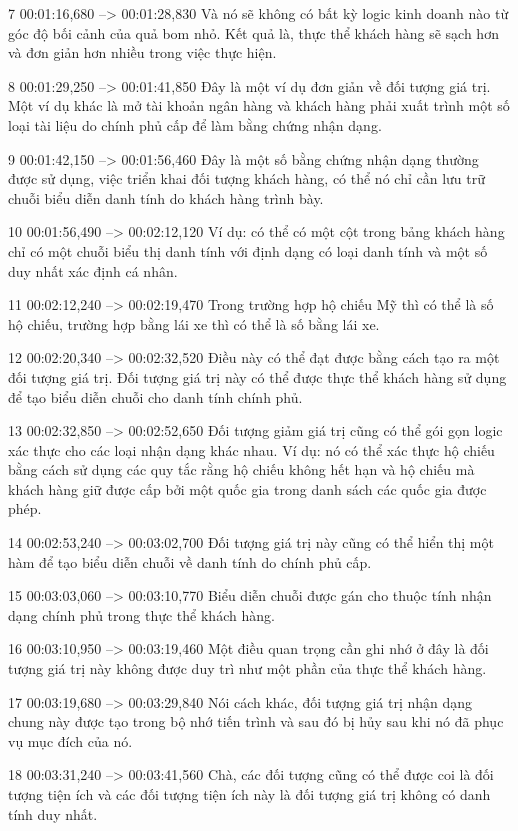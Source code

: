 7
00:01:16,680 --> 00:01:28,830
Và nó sẽ không có bất kỳ logic kinh doanh nào từ góc độ bối cảnh của quả bom nhỏ.  Kết quả là, thực thể khách hàng sẽ sạch hơn và đơn giản hơn nhiều trong việc thực hiện.

8
00:01:29,250 --> 00:01:41,850
Đây là một ví dụ đơn giản về đối tượng giá trị.  Một ví dụ khác là mở tài khoản ngân hàng và khách hàng phải xuất trình một số loại tài liệu do chính phủ cấp để làm bằng chứng nhận dạng.

9
00:01:42,150 --> 00:01:56,460
Đây là một số bằng chứng nhận dạng thường được sử dụng, việc triển khai đối tượng khách hàng, có thể nó chỉ cần lưu trữ chuỗi biểu diễn danh tính do khách hàng trình bày.

10
00:01:56,490 --> 00:02:12,120
Ví dụ: có thể có một cột trong bảng khách hàng chỉ có một chuỗi biểu thị danh tính với định dạng có loại danh tính và một số duy nhất xác định cá nhân.

11
00:02:12,240 --> 00:02:19,470
Trong trường hợp hộ chiếu Mỹ thì có thể là số hộ chiếu, trường hợp bằng lái xe thì có thể là số bằng lái xe.

12
00:02:20,340 --> 00:02:32,520
Điều này có thể đạt được bằng cách tạo ra một đối tượng giá trị.  Đối tượng giá trị này có thể được thực thể khách hàng sử dụng để tạo biểu diễn chuỗi cho danh tính chính phủ.

13
00:02:32,850 --> 00:02:52,650
Đối tượng giảm giá trị cũng có thể gói gọn logic xác thực cho các loại nhận dạng khác nhau.  Ví dụ: nó có thể xác thực hộ chiếu bằng cách sử dụng các quy tắc rằng hộ chiếu không hết hạn và hộ chiếu mà khách hàng giữ được cấp bởi một quốc gia trong danh sách các quốc gia được phép.

14
00:02:53,240 --> 00:03:02,700
Đối tượng giá trị này cũng có thể hiển thị một hàm để tạo biểu diễn chuỗi về danh tính do chính phủ cấp.

15
00:03:03,060 --> 00:03:10,770
Biểu diễn chuỗi được gán cho thuộc tính nhận dạng chính phủ trong thực thể khách hàng.

16
00:03:10,950 --> 00:03:19,460
Một điều quan trọng cần ghi nhớ ở đây là đối tượng giá trị này không được duy trì như một phần của thực thể khách hàng.

17
00:03:19,680 --> 00:03:29,840
Nói cách khác, đối tượng giá trị nhận dạng chung này được tạo trong bộ nhớ tiến trình và sau đó bị hủy sau khi nó đã phục vụ mục đích của nó.

18
00:03:31,240 --> 00:03:41,560
Chà, các đối tượng cũng có thể được coi là đối tượng tiện ích và các đối tượng tiện ích này là đối tượng giá trị không có danh tính duy nhất.

